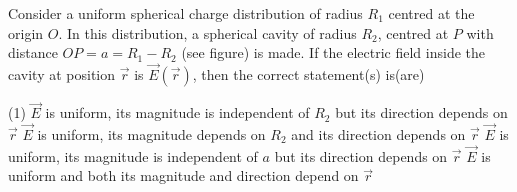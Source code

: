 \item Consider a uniform spherical charge distribution of radius \( R_1 \) centred at the origin \( O \). In this distribution, a spherical cavity of radius \( R_2 \), centred at \( P \) with distance \( OP = a = R_1 - R_2 \) (see figure) is made. If the electric field inside the cavity at position \( \vec{r} \) is \( \vec{E}(\vec{r}) \), then the correct statement(s) is(are)
\begin{center}
\end{center}
    \begin{tasks}(1)
        \task \( \vec{E} \) is uniform, its magnitude is independent of \( R_2 \) but its direction depends on \( \vec{r} \)
        \task \( \vec{E} \) is uniform, its magnitude depends on \( R_2 \) and its direction depends on \( \vec{r} \)
        \task \( \vec{E} \) is uniform, its magnitude is independent of \( a \) but its direction depends on \( \vec{r} \)
        \task \( \vec{E} \) is uniform and both its magnitude and direction depend on \( \vec{r} \)
    \end{tasks}

